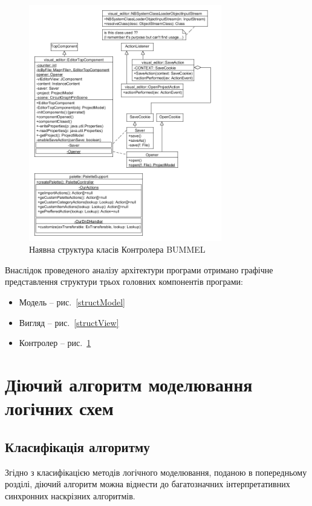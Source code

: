 \documentclass[12pt,a4paper]{article}
\begin{document}
\begin{figure}[h]
  \centering
    \includegraphics[width=0.75\textwidth]{class-diagram-controller.png}
  \caption{Наявна структура класів Контролера BUMMEL\label{structController}}
\end{figure}

Внаслідок проведеного аналізу архітектури програми отримано графічне представлення структури трьох головних компонентів програми:
\begin{itemize}
  \item Модель -- рис.~\ref{structModel}
  \item Вигляд -- рис.~\ref{structView}
  \item Контролер -- рис.~\ref{structController}
\end{itemize}

\clearpage

\section{Діючий алгоритм моделювання логічних схем}

\subsection{Класифікація алгоритму}

Згідно з класифікацією методів логічного моделювання, поданою в попередньому розділі, діючий алгоритм можна віднести до багатозначних інтерпретативних синхронних наскрізних алгоритмів.
\end{document}
